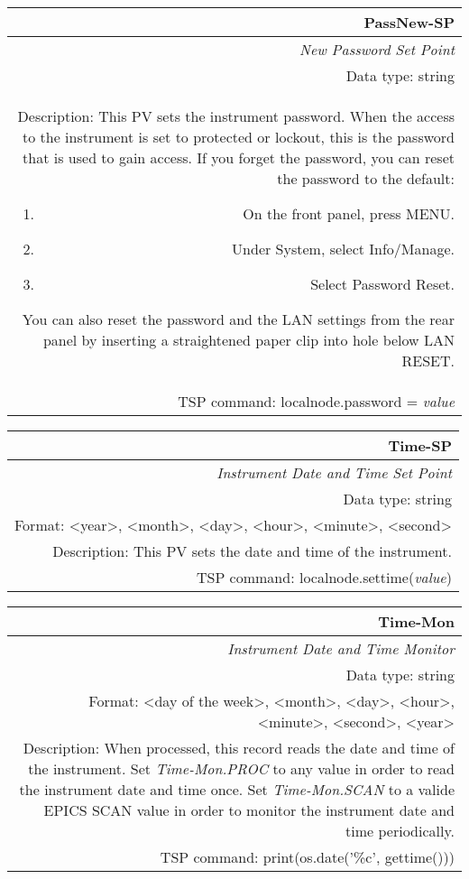 \documentclass[openany]{article}
\begin{document}
		\begin{tabular}{N}
			\hline
			\bfseries PassNew-SP\label{pv:passnew-sp} \\ \hline
			\emph{New Password Set Point} \\
			Data type: string \\
			Description: This PV sets the instrument password. When the access to the instrument is set to protected or lockout, this is the password that is used to gain access. If you forget the password, you can reset the password to the default: \begin{enumerate} \item On the front panel, press MENU. \item Under System, select Info/Manage. \item Select Password Reset. \end{enumerate} You can also reset the password and the LAN settings from the rear panel by inserting a straightened paper clip into hole below LAN RESET. \\
			TSP command: localnode.password = \emph{value}
		\end{tabular}

		\begin{tabular}{N}
			\hline
			\bfseries Time-SP\label{pv:time-sp} \\ \hline
			\emph{Instrument Date and Time Set Point} \\
			Data type: string \\
			Format: \textless year\textgreater, \textless month\textgreater, \textless day\textgreater, \textless hour\textgreater, \textless minute\textgreater, \textless second\textgreater \\
			Description: This PV sets the date and time of the instrument. \\
			TSP command: localnode.settime(\emph{value})
		\end{tabular}

		\begin{tabular}{N}
			\hline
			\bfseries Time-Mon\label{pv:time-mon} \\ \hline
			\emph{Instrument Date and Time Monitor} \\
			Data type: string \\
			Format: \textless day of the week\textgreater, \textless month\textgreater, \textless day\textgreater, \textless hour\textgreater, \textless minute\textgreater, \textless second\textgreater, \textless year\textgreater \\
			Description: When processed, this record reads the date and time of the instrument. Set \emph{Time-Mon.PROC} to any value in order to read the instrument date and time once. Set \emph{Time-Mon.SCAN} to a valide EPICS SCAN value in order to monitor the instrument date and time periodically. \\
			TSP command: print(os.date('\%c', gettime()))
		\end{tabular}
\end{document}
